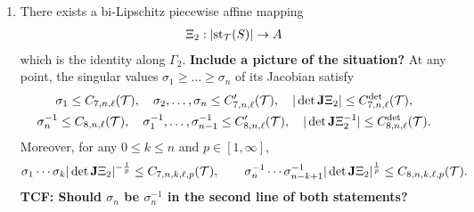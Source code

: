 \documentclass[10pt,a4paper]{article}
\newcommand{\todo}[1]{{\color{RedOrange}\textbf{#1}}}
\begin{document}
\begin{proposition}
\begin{enumerate}
    \item 
    There exists a bi-Lipschitz piecewise affine mapping
    \begin{align*}
        \Xi_{2} : \left| \operatorname{st}_{{\mathcal T}}(S) \right| \rightarrow A
    \end{align*}
    which is the identity along $\Gamma_2$. \todo{Include a picture of the situation?}
    At any point, the singular values $\sigma_1 \geq \dots \geq \sigma_n$ of its Jacobian satisfy 
    \begin{gather*}
        \sigma_1 \leq C_{7,n,\ell}({\mathcal T}),
        \quad 
        \sigma_2,\dots,\sigma_n \leq C'_{7,n,\ell}({\mathcal T}),
        \quad 
        | \det{\mathbf{J}}\Xi_{2} |      \leq C^{\det}_{7,n,\ell}({\mathcal T}),
        \\
        \sigma_n^{-1} \leq C_{8,n,\ell}({\mathcal T}),
        \quad 
        \sigma_1^{-1},\dots,\sigma_{n-1}^{-1} \leq C'_{8,n,\ell}({\mathcal T}),
        \quad 
        | \det{\mathbf{J}}\Xi_{2}^{-1} | \leq C^{\det}_{8,n,\ell}({\mathcal T}).
    \end{gather*}
    Moreover, for any $0 \leq k \leq n$ and $p \in [1,\infty]$,
    \begin{align*}
        \sigma_{1}\cdots\sigma_{k} | \det{\mathbf{J}}\Xi_{2} |^{-\frac 1 p}
        \leq 
        C_{7,n,k,\ell,p}({\mathcal T}),
        \qquad 
        \sigma_{n}^{-1}\cdots\sigma_{n-k+1}^{-1} | \det{\mathbf{J}}\Xi_{2} |^{\frac 1 p}
        \leq 
        C_{8,n,k,\ell,p}({\mathcal T}).
    \end{align*}
    \todo{TCF: Should $\sigma_n$ be $\sigma_n^{-1}$ in the second line of both statements?}
    \end{enumerate}
\end{proposition}
\end{document}
